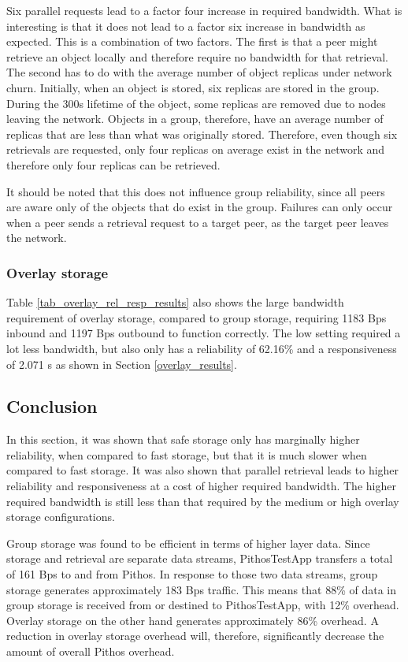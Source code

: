 Six parallel requests lead to a factor four increase in required bandwidth. What is interesting is that it does not lead to a factor six increase in bandwidth as expected. This is a combination of two factors.  The first is that a peer might retrieve an object locally and therefore require no bandwidth for that retrieval. The second has to do with the average number of object replicas under network churn. Initially, when an object is stored, six replicas are stored in the group. During the 300s lifetime of the object, some replicas are removed due to nodes leaving the network. Objects in a group, therefore, have an average number of replicas that are less than what was originally stored. Therefore, even though six retrievals are requested, only four replicas on average exist in the network and therefore only four replicas can be retrieved.

It should be noted that this does not influence group reliability, since all peers are aware only of the objects that do exist in the group. Failures can only occur when a peer sends a retrieval request to a target peer, as the target peer leaves the network.

\subsubsection{Overlay storage}
Table \ref{tab_overlay_rel_resp_results} also shows the large bandwidth requirement of overlay storage, compared to group storage, requiring 1183 Bps inbound and 1197 Bps outbound to function correctly. The low setting required a lot less bandwidth, but also only has a reliability of 62.16\% and a responsiveness of 2.071 s as shown in Section \ref{overlay_results}.

\subsection{Conclusion}

In this section, it was shown that safe storage only has marginally higher reliability, when compared to fast storage, but that it is much slower when compared to fast storage. It was also shown that parallel retrieval leads to higher reliability and responsiveness at a cost of higher required bandwidth. The higher required bandwidth is still less than that required by the medium or high overlay storage configurations.

Group storage was found to be efficient in terms of higher layer data. Since storage and retrieval are separate data streams, PithosTestApp transfers a total of 161 Bps to and from Pithos. In response to those two data streams, group storage generates approximately 183 Bps traffic. This means that 88\% of data in group storage is received from or destined to PithosTestApp, with 12\% overhead. Overlay storage on the other hand generates approximately 86\% overhead. A reduction in overlay storage overhead will, therefore, significantly decrease the amount of overall Pithos overhead.

